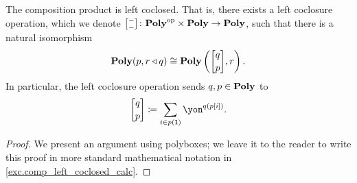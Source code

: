 \documentclass[Book-Poly]{subfiles}
\begin{document}
\begin{proposition}[Meyers] \label{prop.comp_left_coclosed}
The composition product is left coclosed.
That is, there exists a left coclosure operation, which we denote $\lchom{-}{-}\colon\poly\op\times\poly\to\poly$,
such that there is a natural isomorphism
\begin{equation} \label{eqn.lchom_adj_iso}
    \poly(p, r\tri q)\iso\poly\left(\lchom{q}{p}, r\right).
\end{equation}
In particular, the left coclosure operation sends $q,p\in\mathbf{Poly}$ to
\begin{equation} \label{eqn.lchom_def}
    \lchom{q}{p}\coloneqq\sum_{i\in p(\1)}\yon^{q(p[i])}.
\end{equation}
\end{proposition}
\begin{proof} %
We present an argument using polyboxes; we leave it to the reader to write this proof in more standard mathematical notation in \cref{exc.comp_left_coclosed_calc}.


\end{proof}
\end{document}
